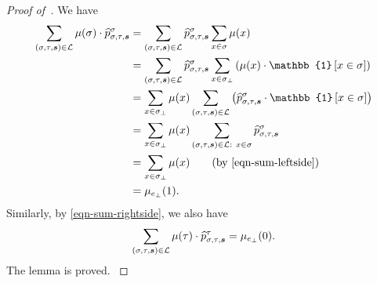 \documentclass[11pt]{article}
\newcommand{\set}[1]{\left\{#1\right\}}
\newcommand{\id}[1]{\mathbb{1}\left[#1\right]}
\def\!#1{\mathtt{#1}}
\newcommand{\seqS}{\boldsymbol{s}}
\newcommand{\qgl}[1]{{\color{purple}{#1}}}
\begin{document}
\begin{proof}[Proof of~]
    {
   We have
    \begin{align*}
        \sum_{(\sigma, \tau, \seqS) \in \mathcal L} \mu(\sigma)\cdot \widehat{p}_{\sigma, \tau, \seqS}^{\sigma} &= \sum_{(\sigma, \tau, \seqS) \in \mathcal L} \widehat{p}_{\sigma, \tau, \seqS}^{\sigma} \sum_{x \in \sigma} \mu(x) \\
        &= \sum_{(\sigma, \tau, \seqS) \in \mathcal L} \widehat{p}_{\sigma, \tau, \seqS}^{\sigma} \sum_{x \in \sigma_\bot} \left(\mu(x) \cdot  \id{x \in \sigma}\right) \\
        &= \sum_{x \in \sigma_\bot} \mu(x) \sum_{(\sigma, \tau, \seqS) \in \mathcal L} \left(\widehat{p}_{\sigma, \tau, \seqS}^{\sigma} \cdot \id{x \in \sigma}\right) \\
        &= \sum_{x \in \sigma_\bot} \mu(x) \sum_{(\sigma, \tau, \seqS) \in \+L : \ x \in \sigma} \widehat{p}_{\sigma, \tau, \seqS}^{\sigma} \\
        &= \sum_{x \in \sigma_\bot} \mu(x) \tag{by~\eqref{eqn-sum-leftside}} \\
        &= \mu_{e_\bot}(1).
    \end{align*}
    Similarly, by \eqref{eqn-sum-rightside}, we also have 
    \begin{align*}
    \sum_{(\sigma, \tau, \seqS) \in \+L}\mu(\tau)\cdot\widehat{p}_{\sigma, \tau, \seqS}^{\tau} = \mu_{e_{\bot}}(0).
    \end{align*}
    The lemma is proved.
    }
\end{proof}



           
                
                
\end{document}
